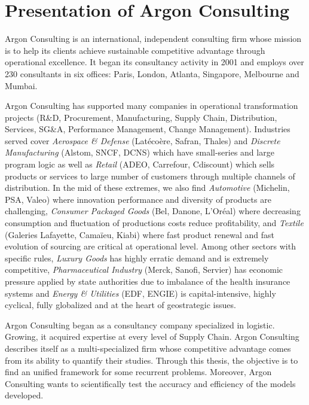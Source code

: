 \section{Presentation of Argon Consulting}


Argon Consulting is an international, independent consulting firm whose mission is to help its clients achieve sustainable competitive advantage through operational excellence.
It began its consultancy activity in 2001 and employs over 230 consultants in six offices: Paris, London, Atlanta, Singapore, Melbourne and Mumbai.


Argon Consulting has supported many companies in operational transformation projects (R\&D, Procurement, Manufacturing, Supply Chain, Distribution, Services, SG\&A, Performance Management, Change Management).
Industries served cover
\emph{Aerospace \& Defense} (Lat\'eco\`ere, Safran, Thales) and
\emph{Discrete Manufacturing} (Alstom, SNCF, DCNS) which have small-series and large program logic as well as
\emph{Retail} (ADEO, Carrefour, Cdiscount) which sells products or services to large number of customers through multiple channels of distribution.
In the mid of these extremes, we also find
\emph{Automotive} (Michelin, PSA, Valeo) where innovation performance and diversity of products are challenging,
\emph{Consumer Packaged Goods} (Bel, Danone, L'Oréal) where decreasing consumption and fluctuation of productions costs reduce profitability, and
\emph{Textile} (Galeries Lafayette, Cama\"ieu, Kiabi) where fast product renewal and fast evolution of sourcing are critical at operational level.
Among other sectors with specific rules,
\emph{Luxury Goods} has highly erratic demand and is extremely competitive,
\emph{Pharmaceutical Industry} (Merck, Sanofi, Servier) has economic pressure applied by state authorities due to imbalance of the health insurance systems and
\emph{Energy \& Utilities} (EDF, ENGIE) is capital-intensive, highly cyclical, fully globalized and at the heart of geostrategic issues.


Argon Consulting began as a consultancy company specialized in logistic.
Growing, it acquired expertise at every level of Supply Chain.
Argon Consulting describes itself as a multi-specialized firm whose competitive advantage comes from its ability to quantify their studies.
Through this thesis, the objective is to find an unified framework for some recurrent problems.
Moreover, Argon Consulting wants to scientifically test the accuracy and efficiency of the models developed.





